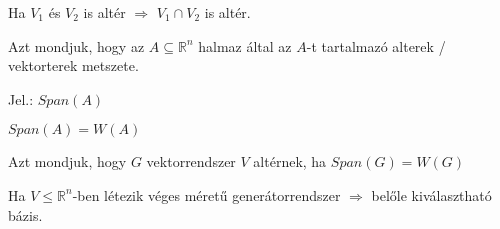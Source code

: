 	\begin{frame}
		\begin{tcolorbox}[title={Tétel: Alterek metszete}]
			Ha $V_1$ és $V_2$ is altér $\Rightarrow$ $V_1 \cap V_2$ is altér.
		\end{tcolorbox}
		
		\begin{tcolorbox}[title={Def.: Span}]
			Azt mondjuk, hogy az $A \subseteq \mathbb{R}^n$ halmaz által  az $A$-t tartalmazó alterek / vektorterek metszete.\\
			\msmallskip
			
			Jel.: $Span(A)$
		\end{tcolorbox}
		
		\begin{tcolorbox}[title={Tétel: Span és Lineáris burok}]
			$Span(A) = W(A)$
		\end{tcolorbox}
		
		\begin{tcolorbox}[title={Def.: Generátorrendszer}]
			Azt mondjuk, hogy $G$ vektorrendszer  $V$ altérnek, ha $Span(G) = W(G)$
		\end{tcolorbox}
		
		\begin{tcolorbox}[title={Tétel.: Generátorrendszer létezése}]
			Ha $V \leq \mathbb{R}^n$-ben létezik véges méretű generátorrendszer $\Rightarrow$ belőle kiválasztható bázis.
		\end{tcolorbox}
	\end{frame}
	
